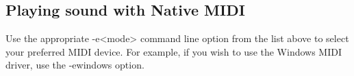 

\subsection{Playing sound with Native MIDI}

Use the appropriate -e<mode> command line option from the list above to
select your preferred MIDI device. For example, if you wish to use the
Windows MIDI driver, use the -ewindows option.
